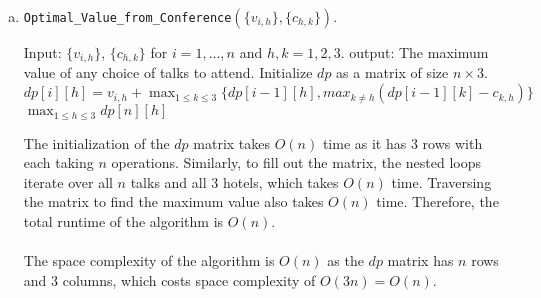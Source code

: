 \documentclass[10pt]{article}
\begin{document}
\begin{solution}
\begin{enumerate} [(a)]
    \item
\begin{algorithm}[H]
\caption{\texttt{Optimal\_Value\_from\_Conference}$(\{v_{i,h}\}, \{c_{h,k}\})$.}
\begin{algorithmic}
    \State Input: $\{v_{i,h}\}$, $\{c_{h,k}\}$ for $i = 1, \ldots, n$ and $h,k = 1,2,3$.
    \State output: The maximum value of any choice of talks to attend.
    \State Initialize $dp$ as a matrix of size $n \times 3$.
            \State $dp[i][h] = v_{i,h} + \max_{1 \leq k \leq 3} \{ dp[i-1][h], max_{k \neq h}(dp[i-1][k] - c_{k,h})\}$
        \EndFor
    \EndFor
    \State \Return $\max_{1 \leq h \leq 3} dp[n][h]$
\end{algorithmic}
\end{algorithm}
The initialization of the $dp$ matrix takes $O(n)$ time as it has 3 rows with each taking $n$ operations. Similarly, to fill out the matrix, the nested loops iterate over all $n$ talks and all $3$ hotels, which takes $O(n)$ time. Traversing the matrix to find the maximum value also takes $O(n)$ time. Therefore, the total runtime of the algorithm is $O(n)$.\\\\
The space complexity of the algorithm is $O(n)$ as the $dp$ matrix has $n$ rows and $3$ columns, which costs space complexity of $O(3n) = O(n)$. 


\end{enumerate}
\end{solution}
\newpage


\end{document}
